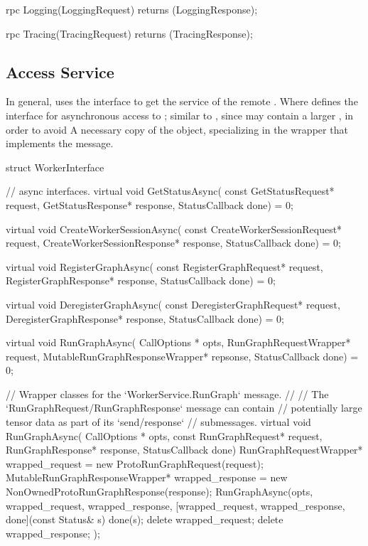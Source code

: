\begin{content}
\begin{leftbar}
\begin{c++}
{  rpc Logging(LoggingRequest) 
      returns (LoggingResponse);

  rpc Tracing(TracingRequest) 
      returns (TracingResponse);
}
\end{c++}
\end{leftbar}

\subsection{Access Service}

In general,  uses the interface  to get the service of the remote . Where  defines the interface for asynchronous access to ; similar to , since  may contain a larger , in order to avoid A necessary copy of the object, specializing in the wrapper that implements the message.

\begin{leftbar}
\begin{c++}
struct WorkerInterface {
  // async interfaces.
  virtual void GetStatusAsync(
      const GetStatusRequest* request,
      GetStatusResponse* response,
      StatusCallback done) = 0;

  virtual void CreateWorkerSessionAsync(
      const CreateWorkerSessionRequest* request,
      CreateWorkerSessionResponse* response, 
      StatusCallback done) = 0;

  virtual void RegisterGraphAsync(
      const RegisterGraphRequest* request,
      RegisterGraphResponse* response,
      StatusCallback done) = 0;

  virtual void DeregisterGraphAsync(
      const DeregisterGraphRequest* request,
      DeregisterGraphResponse* response,
      StatusCallback done) = 0;

  virtual void RunGraphAsync(
      CallOptions * opts, 
      RunGraphRequestWrapper* request,
      MutableRunGraphResponseWrapper* repsonse,
      StatusCallback done) = 0;

  // Wrapper classes for the `WorkerService.RunGraph` message.
  //
  // The `RunGraphRequest/RunGraphResponse` message can contain 
  // potentially large tensor data as part of its `send/response`
  // submessages.
  virtual void RunGraphAsync(
      CallOptions * opts, 
      const RunGraphRequest* request,
      RunGraphResponse* response, 
      StatusCallback done) {
    RunGraphRequestWrapper* wrapped_request = 
        new ProtoRunGraphRequest(request);
    MutableRunGraphResponseWrapper* wrapped_response =
        new NonOwnedProtoRunGraphResponse(response);
    RunGraphAsync(opts, wrapped_request, wrapped_response,
        [wrapped_request, wrapped_response, done](const Status& s) {
            done(s);
            delete wrapped_request;
            delete wrapped_response;
        });
  }

}
\end{c++}
\end{leftbar}
\end{content}
